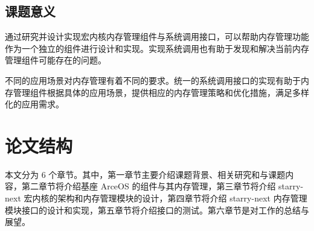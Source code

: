 \subsection{课题意义}

通过研究并设计实现宏内核内存管理组件与系统调用接口，可以帮助内存管理功能作为一个独立的组件进行设计和实现。实现系统调用也有助于发现和解决当前内存管理组件可能存在的问题。

不同的应用场景对内存管理有着不同的要求。统一的系统调用接口的实现有助于内存管理组件根据具体的应用场景，提供相应的内存管理策略和优化措施，满足多样化的应用需求。

\section{论文结构}

本文分为 6 个章节。其中，第一章节主要介绍课题背景、相关研究和与课题内容，第二章节将介绍基座 ArceOS 的组件与其内存管理，第三章节将介绍 starry-next 宏内核的架构和内存管理模块的设计，第四章节将介绍 starry-next 内存管理模块接口的设计和实现，第五章节将介绍接口的测试。第六章节是对工作的总结与展望。